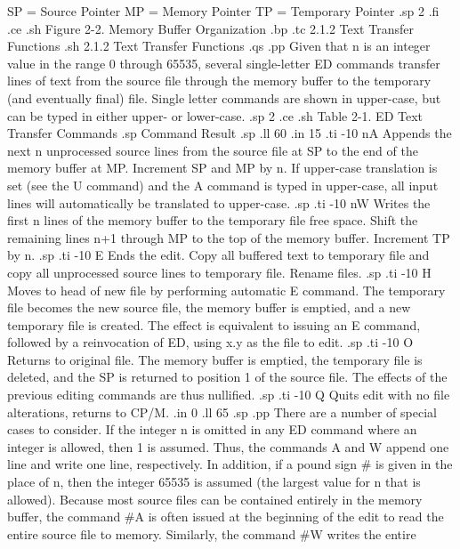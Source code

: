                         SP = Source Pointer
                        MP = Memory Pointer
                        TP = Temporary Pointer
.sp 2
.fi
.ce
.sh
Figure 2-2.  Memory Buffer Organization
.bp
.tc         2.1.2  Text Transfer Functions
.sh
2.1.2  Text Transfer Functions
.qs
.pp
Given that n is an integer value in the range 0 through 65535, several
single-letter ED commands transfer lines of text from the source file through
the memory buffer to the temporary (and eventually final) file.  Single letter
commands are shown in upper-case, but can be typed in either upper- or
lower-case.
.sp 2
.ce
.sh
Table 2-1.  ED Text Transfer Commands
.sp
   Command                          Result
.sp
.ll 60
.in 15
.ti -10
nA        Appends the next n unprocessed source lines from the source file at
SP to the end of the memory buffer at MP.  Increment SP and MP by n.  If
upper-case translation is set (see the U command) and the A command is typed
in upper-case, all input lines will automatically be translated to upper-case.
.sp
.ti -10
nW        Writes the first n lines of the memory buffer to the temporary
file free space.  Shift the remaining lines n+1 through MP to the top of the
memory buffer.  Increment TP by n.
.sp
.ti -10
E         Ends the edit.  Copy all buffered text to temporary file and copy
all unprocessed source lines to temporary file.  Rename files.
.sp
.ti -10
H         Moves to head of new file by performing automatic E command.  The
temporary file becomes the new source file, the memory buffer is emptied, and
a new temporary file is created.  The effect is equivalent to issuing an E
command, followed by a reinvocation of ED, using x.y as the file to edit.
.sp
.ti -10
O         Returns to original file.  The memory buffer is emptied, the
temporary file is deleted, and the SP is returned to position 1 of the
source file.  The effects of the previous editing commands are thus nullified.
.sp
.ti -10
Q         Quits edit with no file alterations, returns to CP/M.
.in 0
.ll 65
.sp
.pp
There are a number of special cases to consider.  If the integer n is omitted
in any ED command where an integer is allowed, then 1 is assumed.  Thus, the
commands A and W append one line and write one line, respectively.  In
addition, if a pound sign # is given in the place of n, then the integer
65535 is assumed (the largest value for n that is allowed).  Because most
source files can be contained entirely in the memory buffer,
the command #A is often issued at the beginning of the edit to read the
entire source file to memory.  Similarly, the command #W writes the entire
